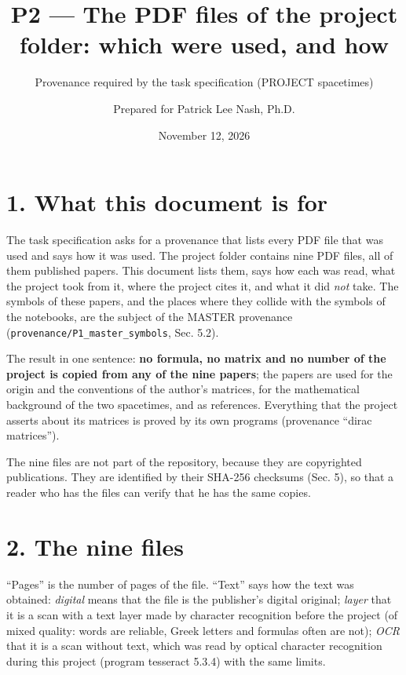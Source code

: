 \documentclass[
  10pt,
]{article}
\title{P2 --- The PDF files of the project folder: which were used, and
how}
\subtitle{Provenance required by the task specification (PROJECT
spacetimes)}
\author{Prepared for Patrick Lee Nash, Ph.D.}
\date{November 12, 2026}
\begin{document}
\maketitle

\hypertarget{what-this-document-is-for}{%
\section{1. What this document is for}\label{what-this-document-is-for}}

The task specification asks for a provenance that lists every PDF file
that was used and says how it was used. The project folder contains nine
PDF files, all of them published papers. This document lists them, says
how each was read, what the project took from it, where the project
cites it, and what it did \emph{not} take. The symbols of these papers,
and the places where they collide with the symbols of the notebooks, are
the subject of the MASTER provenance
(\texttt{provenance/P1\_master\_symbols}, Sec. 5.2).

The result in one sentence: \textbf{no formula, no matrix and no number
of the project is copied from any of the nine papers}; the papers are
used for the origin and the conventions of the author's matrices, for
the mathematical background of the two spacetimes, and as references.
Everything that the project asserts about its matrices is proved by its
own programs (provenance ``dirac matrices'').

The nine files are not part of the repository, because they are
copyrighted publications. They are identified by their SHA-256 checksums
(Sec. 5), so that a reader who has the files can verify that he has the
same copies.

\hypertarget{the-nine-files}{%
\section{2. The nine files}\label{the-nine-files}}

``Pages'' is the number of pages of the file. ``Text'' says how the text
was obtained: \emph{digital} means that the file is the publisher's
digital original; \emph{layer} that it is a scan with a text layer made
by character recognition before the project (of mixed quality: words are
reliable, Greek letters and formulas often are not); \emph{OCR} that it
is a scan without text, which was read by optical character recognition
during this project (program tesseract 5.3.4) with the same limits.
\end{document}
